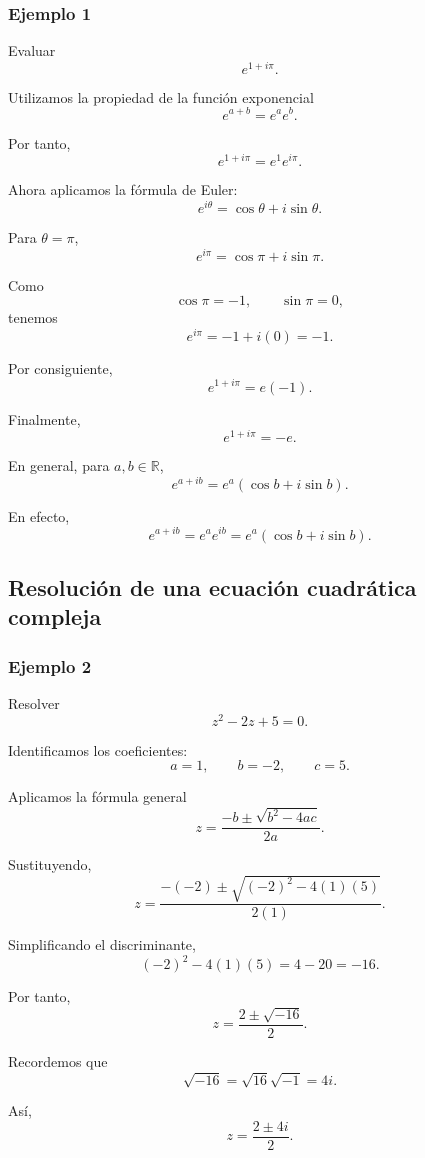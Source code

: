 \documentclass[12pt]{article}
\begin{document}
\subsubsection*{Ejemplo 1}

Evaluar
\[
e^{1+i\pi}.
\]

Utilizamos la propiedad de la función exponencial
\[
e^{a+b}=e^a e^b.
\]

Por tanto,
\[
e^{1+i\pi}
=
e^1e^{i\pi}.
\]

Ahora aplicamos la fórmula de Euler:
\[
e^{i\theta}
=
\cos\theta+i\sin\theta.
\]

Para $\theta=\pi$,
\[
e^{i\pi}
=
\cos\pi+i\sin\pi.
\]

Como
\[
\cos\pi=-1,
\qquad
\sin\pi=0,
\]
tenemos
\[
e^{i\pi}
=
-1+i(0)
=
-1.
\]

Por consiguiente,
\[
e^{1+i\pi}
=
e(-1).
\]

Finalmente,
\[
\boxed{
e^{1+i\pi}=-e
}.
\]

En general, para $a,b\in\mathbb{R}$,
\[
\boxed{
e^{a+ib}
=
e^a(\cos b+i\sin b)
}.
\]

En efecto,
\[
e^{a+ib}
=
e^a e^{ib}
=
e^a(\cos b+i\sin b).
\]

\subsection{Resolución de una ecuación cuadrática compleja}

\subsubsection*{Ejemplo 2}

Resolver
\[
z^2-2z+5=0.
\]

Identificamos los coeficientes:
\[
a=1,
\qquad
b=-2,
\qquad
c=5.
\]

Aplicamos la fórmula general
\[
z
=
\frac{-b\pm\sqrt{b^2-4ac}}{2a}.
\]

Sustituyendo,
\[
z
=
\frac{-(-2)\pm
\sqrt{(-2)^2-4(1)(5)}}{2(1)}.
\]

Simplificando el discriminante,
\[
(-2)^2-4(1)(5)
=
4-20
=
-16.
\]

Por tanto,
\[
z
=
\frac{2\pm\sqrt{-16}}{2}.
\]

Recordemos que
\[
\sqrt{-16}
=
\sqrt{16}\sqrt{-1}
=
4i.
\]

Así,
\[
z
=
\frac{2\pm4i}{2}.
\]
\end{document}
